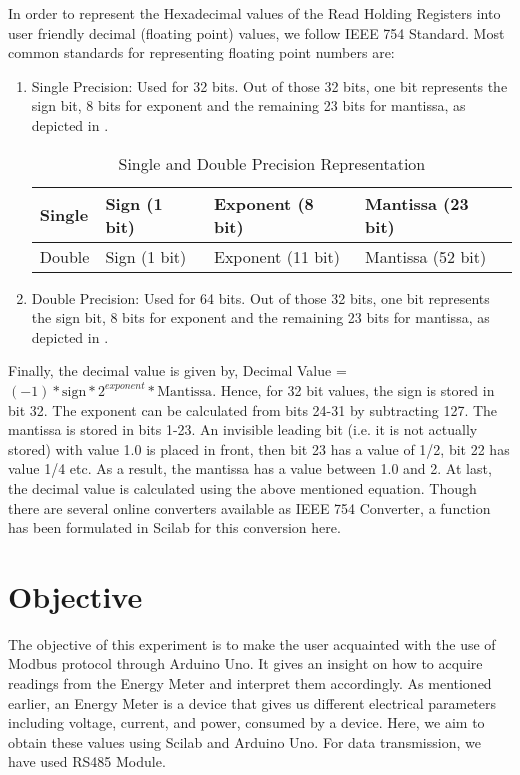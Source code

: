 In order to represent the Hexadecimal values of the Read Holding Registers into user friendly decimal (floating point) values, we follow IEEE 754 Standard. Most common standards for representing floating point numbers are: 
\begin{enumerate}
\item Single Precision: Used for 32 bits. Out of those 32 bits, one bit represents the sign bit, 8 bits for exponent and the remaining 23 bits for mantissa, as depicted in .

\begin{table}
\centering
\caption{Single and Double Precision Representation}
\label{tab:single-precision}
\begin{tabular}{|l|l|l|l|}
\hline
Single & Sign (1 bit) & Exponent (8 bit) & Mantissa (23 bit) \\ \hline 
Double & Sign (1 bit) & Exponent (11 bit) & Mantissa (52 bit) \\ \hline
\end{tabular}
\end{table}
\item Double Precision: Used for 64 bits. Out of those 32 bits, one bit represents the sign bit, 8 bits for exponent and the remaining 23 bits for mantissa, as depicted in .
\end{enumerate}
Finally, the decimal value is given by, 
Decimal Value = $( - 1) * \text{sign} * 2^{exponent}* \text{Mantissa}$.
Hence, for 32 bit values, the sign is stored in bit 32. The exponent
can be calculated from bits 24-31 by subtracting 127. The mantissa is
stored in bits 1-23. An invisible leading bit (i.e. it is not actually
stored) with value 1.0 is placed in front, then bit 23 has a value of
1/2, bit 22 has value 1/4 etc. As a result, the mantissa has a value
between 1.0 and 2. At last, the decimal value is calculated using the
above mentioned equation. Though there are several online converters
available as IEEE 754 Converter, a function has been formulated in
Scilab for this conversion here.  


\section{Objective}
The objective of this experiment is to make the user acquainted with the use of Modbus protocol through Arduino Uno. It gives an insight on how to acquire readings from the Energy Meter and interpret them accordingly. As mentioned earlier, an Energy Meter is a device that gives us different electrical parameters including voltage, current, and power, consumed by a device. Here, we aim to obtain these values using Scilab and Arduino Uno. For data transmission, we have used RS485 Module.


